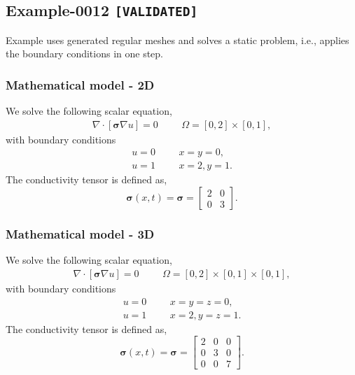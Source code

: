 %
\clearpage
%
\subsection{Example-0012 \texttt{[VALIDATED]}}
%
Example uses generated regular meshes and solves a static problem, i.e., applies
the boundary conditions in one step.
%
%
\subsubsection{Mathematical model - 2D}
%
We solve the following scalar equation,
%
\begin{align}
    \nabla \cdot [\boldsymbol{\sigma} \nabla u] = 0 & &&\Omega = [0, 2] \times [0, 1],
\end{align}
%
with boundary conditions
%
\begin{align}
    u = 0 & &&x = y = 0, \\
    u = 1 & &&x = 2, y = 1.
\end{align}
%
The conductivity tensor is defined as,
%
\begin{equation}
    \boldsymbol{\sigma} (x, t) = \boldsymbol{\sigma} = \begin{bmatrix} 2 & 0 \\ 0 & 3 \end{bmatrix}.
\end{equation}
%
%
\subsubsection{Mathematical model - 3D}
%
We solve the following scalar equation,
%
\begin{align}
    \nabla \cdot [\boldsymbol{\sigma} \nabla u] = 0 & &&\Omega = [0, 2] \times [0, 1] \times [0, 1],
\end{align}
%
with boundary conditions
%
\begin{align}
    u = 0 & &&x = y = z = 0, \\
    u = 1 & &&x = 2, y = z = 1.
\end{align}
%
The conductivity tensor is defined as,
%
\begin{equation}
    \boldsymbol{\sigma} (x, t) = \boldsymbol{\sigma} = \begin{bmatrix} 2 & 0 & 0 \\ 0 & 3 & 0 \\ 0 & 0 & 7 \end{bmatrix}.
\end{equation}
%
%
